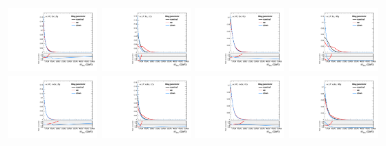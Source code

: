 \begin{figure}[htbp]
  \centering
  \includegraphics[width=0.21\textwidth]{fig/uncertainties/systs_res_e_HP_bb_LDy_Diag_ProjX.pdf}
  \includegraphics[width=0.21\textwidth]{fig/uncertainties/systs_res_e_LP_bb_LDy_Diag_ProjX.pdf}
  \includegraphics[width=0.21\textwidth]{fig/uncertainties/systs_res_e_HP_bb_HDy_Diag_ProjX.pdf}
  \includegraphics[width=0.21\textwidth]{fig/uncertainties/systs_res_e_LP_bb_HDy_Diag_ProjX.pdf}\\
  \includegraphics[width=0.21\textwidth]{fig/uncertainties/systs_res_e_HP_nobb_LDy_Diag_ProjX.pdf}
  \includegraphics[width=0.21\textwidth]{fig/uncertainties/systs_res_e_LP_nobb_LDy_Diag_ProjX.pdf}
  \includegraphics[width=0.21\textwidth]{fig/uncertainties/systs_res_e_HP_nobb_HDy_Diag_ProjX.pdf}
  \includegraphics[width=0.21\textwidth]{fig/uncertainties/systs_res_e_LP_nobb_HDy_Diag_ProjX.pdf}\\

\end{figure}
